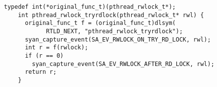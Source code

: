 \begin{lstlisting}[caption=Funcția
                           \lstinline{pthread_rwlock_tryrdlock} din
                           \lstinline{pthread_shim},
                   float, floatplacement=H,
                   label=code:pthread_shim_func]
    typedef int(*original_func_t)(pthread_rwlock_t*);
    int pthread_rwlock_tryrdlock(pthread_rwlock_t* rwl) {
      original_func_t f = (original_func_t)dlsym(
            RTLD_NEXT, "pthread_rwlock_tryrdlock");
      syan_capture_event(SA_EV_RWLOCK_ON_TRY_RD_LOCK, rwl);
      int r = f(rwlock);
      if (r == 0)
        syan_capture_event(SA_EV_RWLOCK_AFTER_RD_LOCK, rwl);
      return r;
    }
\end{lstlisting}
